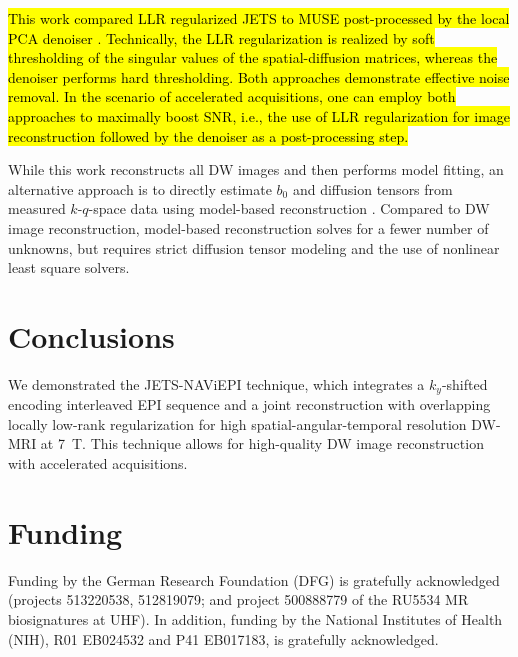 \documentclass[preprint,12pt,authoryear,review]{elsarticle}
\begin{document}
    \hl{This work compared LLR regularized JETS to
    MUSE post-processed by the local PCA denoiser
    \mbox{\citep{cordero_2019_cplxdwi}}.
    Technically, the LLR regularization is realized
    by soft thresholding of the singular values
    of the spatial-diffusion matrices, whereas
    the denoiser performs hard thresholding.
    Both approaches demonstrate effective noise removal.
    In the scenario of accelerated acquisitions,
    one can employ both approaches to maximally boost SNR,
    i.e., the use of LLR regularization for image reconstruction
    followed by the denoiser as a post-processing step.}

    While this work reconstructs all DW images and
    then performs model fitting,
    an alternative approach is to directly estimate
    $b_0$ and diffusion tensors
    from measured $k$-$q$-space data
    using model-based reconstruction
    \citep{knoll_2015_mobadiff,dong_2018_mobadiff,shafieizargar_2023_adept}.
    Compared to DW image reconstruction,
    model-based reconstruction solves for a fewer number of unknowns,
    but requires strict diffusion tensor modeling
    and the use of nonlinear least square solvers.

    \section{Conclusions}
    \label{SEC:Conc}

    We demonstrated the JETS-NAViEPI technique, which integrates
    a $k_y$-shifted encoding interleaved EPI sequence and
    a joint reconstruction with overlapping locally low-rank regularization
    for high spatial-angular-temporal resolution DW-MRI at \SI{7}{\tesla}.
    This technique allows for high-quality DW image reconstruction
    with accelerated acquisitions.

    \section*{Funding}

    Funding by the German Research Foundation (DFG)
    is gratefully acknowledged
    (projects 513220538, 512819079;
    and project 500888779 of the RU5534 MR biosignatures at UHF).
    In addition, funding by the National Institutes of Health (NIH),
    R01 EB024532 and P41 EB017183, is gratefully acknowledged.
\end{document}
